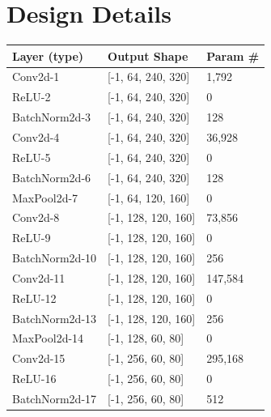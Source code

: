 


    \chapter{Design Details}
    
        \begin{table}[]
    	\begin{center}
    		\begin{tabular}{| l | l | p{3cm} |}
    			\hline
    			Layer (type)       & Output Shape            & Param \#  \\ \hline
    			Conv2d-1           & {[}-1, 64, 240, 320{]}  & 1,792     \\ \hline
    			ReLU-2             & {[}-1, 64, 240, 320{]}  & 0         \\ \hline
    			BatchNorm2d-3      & {[}-1, 64, 240, 320{]}  & 128       \\ \hline
    			Conv2d-4           & {[}-1, 64, 240, 320{]}  & 36,928    \\ \hline
    			ReLU-5             & {[}-1, 64, 240, 320{]}  & 0         \\ \hline
    			BatchNorm2d-6      & {[}-1, 64, 240, 320{]}  & 128       \\ \hline
    			MaxPool2d-7        & {[}-1, 64, 120, 160{]}  & 0         \\ \hline
    			Conv2d-8           & {[}-1, 128, 120, 160{]} & 73,856    \\ \hline
    			ReLU-9             & {[}-1, 128, 120, 160{]} & 0         \\ \hline
    			BatchNorm2d-10     & {[}-1, 128, 120, 160{]} & 256       \\ \hline
    			Conv2d-11          & {[}-1, 128, 120, 160{]} & 147,584   \\ \hline
    			ReLU-12            & {[}-1, 128, 120, 160{]} & 0         \\ \hline
    			BatchNorm2d-13     & {[}-1, 128, 120, 160{]} & 256       \\ \hline
    			MaxPool2d-14       & {[}-1, 128, 60, 80{]}   & 0         \\ \hline
    			Conv2d-15          & {[}-1, 256, 60, 80{]}   & 295,168   \\ \hline
    			ReLU-16            & {[}-1, 256, 60, 80{]}   & 0         \\ \hline
    			BatchNorm2d-17     & {[}-1, 256, 60, 80{]}   & 512       \\ \hline

\end{tabular}
\end{center}
\end{table}

